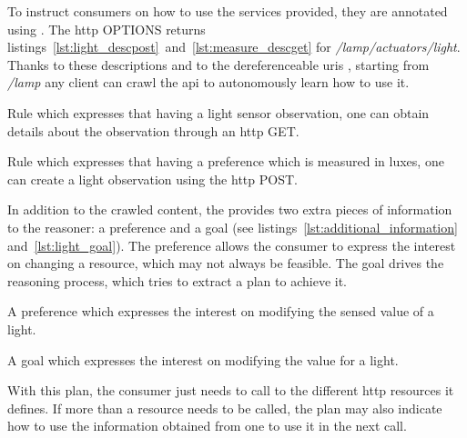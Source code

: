 
To instruct consumers on how to use the services provided, they are annotated using \restdesc{}.
The \acs{http} OPTIONS returns listings~\ref{lst:light_descpost}~and~\ref{lst:measure_descget} for \emph{/lamp/actuators/light}.
Thanks to these descriptions and to the dereferenceable \acsp{uri} \citep{sauermann_cool_2008}, starting from \emph{/lamp} any client can crawl the \acs{api} to autonomously learn how to use it.

\begin{listing}
  
  \caption{Rule which expresses that having a light sensor observation, one can obtain details about the observation through an \acs{http} GET.}
  \label{lst:measure_descget}
\end{listing}

\begin{listing}
  
  \caption{Rule which expresses that having a preference which is measured in luxes, one can create a light observation using the \acs{http} POST.}
  \label{lst:light_descpost}
\end{listing}


In addition to the crawled content, the \nodeConsRest{} provides two extra pieces of information to the reasoner: a preference and a goal (see listings~\ref{lst:additional_information} and~\ref{lst:light_goal}).
The preference allows the consumer to express the interest on changing a resource, which may not always be feasible.
The goal drives the reasoning process, which tries to extract a plan to achieve it.

\begin{listing}
  
  \caption{A preference which expresses the interest on modifying the sensed value of a light.}
  \label{lst:additional_information}
\end{listing}

\begin{listing}
  
  \caption{A goal which expresses the interest on modifying the value for a light.}
  \label{lst:light_goal}
\end{listing}

With this plan, the consumer just needs to call to the different \acs{http} resources it defines.
If more than a resource needs to be called, the plan may also indicate how to use the information obtained from one to use it in the next call.